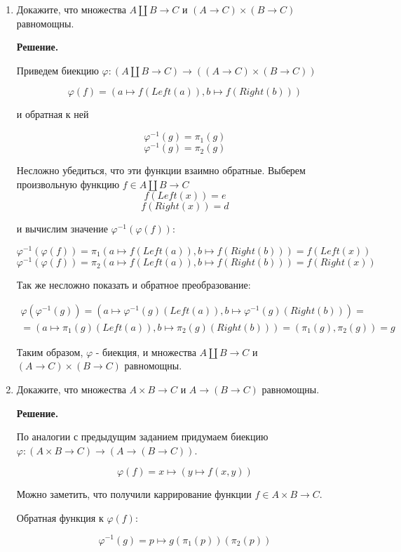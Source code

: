 \begin{enumerate}
\item Докажите, что множества $A \amalg B \to C$ и $(A \to C) \times (B 
\to C)$ равномощны.

\textbf{Решение.} 

Приведем биекцию $\varphi : (A \amalg B \to C) \rightarrow ((A \to C) 
\times (B \to C))$

$$\varphi(f) = (a \mapsto f(Left(a)), b \mapsto f(Right(b)))$$

и обратная к ней

$$\varphi^{-1}(g) = \pi_1(g)$$
$$\varphi^{-1}(g) = \pi_2(g)$$

Несложно убедиться, что эти функции взаимно обратные.
Выберем произвольную функцию $f\in A \amalg B \to C$
$$f(Left(x)) = e$$
$$f(Right(x)) = d$$

и вычислим значение $\varphi^{-1}(\varphi(f))$:

$$\varphi^{-1}(\varphi(f)) = \pi_1(a \mapsto f(Left(a)), b \mapsto 
f(Right(b))) = f(Left(x))$$
$$\varphi^{-1}(\varphi(f)) = \pi_2(a \mapsto f(Left(a)), b \mapsto 
f(Right(b))) = f(Right(x))$$

Так же несложно показать и обратное преобразование:

\begin{equation*}
\begin{array} {lcl}
	\varphi(\varphi^{-1}(g)) = (a \mapsto \varphi^{-1}(g)(Left(a)), b 
	\mapsto \varphi^{-1}(g)(Right(b))) = \\
	= (a \mapsto \pi_1(g)(Left(a)), b \mapsto \pi_2(g)(Right(b))) = 
	(\pi_1(g), \pi_2(g)) = g
\end{array}
\end{equation*}

Таким образом, $\varphi$ - биекция, и множества $A \amalg B \to C$ и $(A 
\to C) \times (B \to C)$ равномощны.

\item Докажите, что множества $A \times B \to C$ и $A \to (B \to C)$ 
равномощны.

\textbf{Решение.} 

По аналогии с предыдущим заданием придумаем биекцию $\varphi : (A \times B 
\to C)\to (A \to (B \to C))$.

$$\varphi(f) = x \mapsto (y \mapsto f(x, y))$$

Можно заметить, что получили каррирование функции $f \in A \times B \to C$.

Обратная функция к $\varphi(f)$:

$$\varphi^{-1}(g) = p \mapsto g(\pi_1(p))(\pi_2(p))$$


\end{enumerate}
